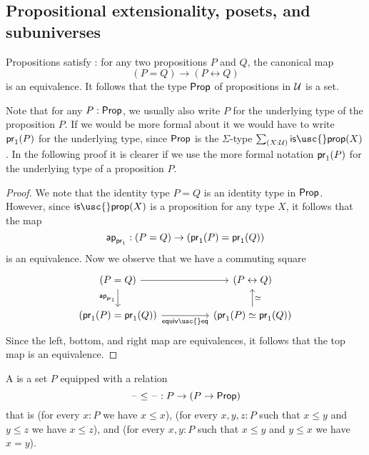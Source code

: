 \subsection{Propositional extensionality, posets, and subuniverses}

\begin{thm}\label{thm:propositional-extensionality}
  Propositions satisfy :
  for any two propositions $P$ and $Q$, the canonical map
  \begin{equation*}
    (P=Q)\to (P\leftrightarrow Q)
  \end{equation*}
  is an equivalence. It follows that the type $\mathsf{Prop}$ of propositions in $\mathcal{U}$ is a set.
\end{thm}

Note that for any $P:\mathsf{Prop}$, we usually also write $P$ for the underlying type of the proposition $P$. If we would be more formal about it we would have to write $\mathsf{pr}_{1}(P)$ for the underlying type, since $\mathsf{Prop}$ is the $\Sigma$-type $\sm{X:\UU}\mathsf{is\usc{}prop}(X)$. In the following proof it is clearer if we use the more formal notation $\mathsf{pr}_{1}(P)$ for the underlying type of a proposition $P$.

\begin{proof}
  We note that the identity type $P=Q$ is an identity type in $\mathsf{Prop}$. However, since $\mathsf{is\usc{}prop}(X)$ is a proposition for any type $X$, it follows that the map
  \begin{equation*}
    \mathsf{ap}_{\mathsf{pr}_{1}} : (P = Q) \to (\mathsf{pr}_{1}(P) = \mathsf{pr}_{1}(Q))
  \end{equation*}
  is an equivalence. Now we observe that we have a commuting square
  \begin{equation*}
    \begin{tikzcd}[column sep=huge]
      (P=Q) \arrow[d,swap,"\apfunc{\proj 1}"] \arrow[r] & (P\leftrightarrow Q) \\
      (\proj 1(P)=\proj 1(Q)) \arrow[r,swap,"\mathsf{equiv\usc{}eq}"] & (\proj 1(P)\simeq\proj 1(Q)) \arrow[u,swap,"\simeq"]
    \end{tikzcd}
  \end{equation*}
  Since the left, bottom, and right map are equivalences, it follows that the top map is an equivalence.
\end{proof}

\begin{defn}
  A  is a set $P$ equipped with a relation
  \begin{equation*}
    \mathord{\hspace{1pt}\text{--}\hspace{1pt}}\leq\mathord{\hspace{1pt}\text{--}\hspace{1pt}} : P \to (P \to \mathsf{Prop})
  \end{equation*}
  that is  (for every $x:P$ we have $x\leq x$),  (for every $x,y,z:P$ such that $x\leq y$ and $y\leq z$ we have $x\leq z$), and  (for every $x,y:P$ such that $x\leq y$ and $y\leq x$ we have $x=y$).
\end{defn}

